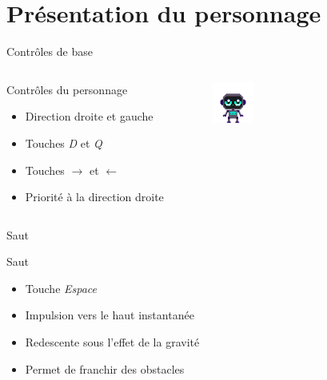 \documentclass{beamer}
\begin{document}
{\section{Présentation du personnage}
\begin{frame}{Contrôles de base}
    \begin{columns}
            \begin{block}{Contrôles du personnage}
                \begin{itemize}
                    \item[\bullet] Direction droite et gauche
                    \item[\bullet] Touches \emph{D} et \emph{Q}
                    \item[\bullet] Touches $\rightarrow$ et $\leftarrow$
                    \item[\bullet] Priorité à la direction droite
                \end{itemize}
            \end{block}
            \begin{figure}
                \centering
                \includegraphics[width=0.8\textwidth]{character_placeholder}
            \end{figure}
    \end{columns}
\end{frame}

\begin{frame}{Saut}
    \begin{block}{Saut}
        \begin{itemize}
            \item[\bullet] Touche \emph{Espace}
            \item[\bullet] Impulsion vers le haut instantanée
            \item[\bullet] Redescente sous l'effet de la gravité 
            \item[\bullet] Permet de franchir des obstacles
        \end{itemize}
    \end{block}
\end{frame}

}
\end{document}
